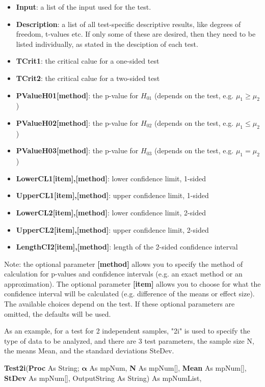 \begin{itemize}
	\item \textbf{Input}: a list of the input used for the test.
	\item \textbf{Description}: a list of all test-specific descriptive results, like degrees of freedom, t-values etc. If only some of these are desired, then they need to be listed individually, as stated in the desciption of each test.
	\item \textbf{TCrit1}: the critical calue for a one-sided test
	\item \textbf{TCrit2}: the critical calue for a two-sided test
	\item \textbf{PValueH01[method]}: the p-value for $H_{01}$ (depends on the test, e.g. $\mu_1 \geq \mu_2$)
	\item \textbf{PValueH02[method]}: the p-value for $H_{02}$ (depends on the test, e.g. $\mu_1 \leq \mu_2$)
	\item \textbf{PValueH03[method]}: the p-value for $H_{03}$ (depends on the test, e.g. $\mu_1 = \mu_2$)
	\item \textbf{LowerCL1[item],[method]}: lower confidence limit, 1-sided
	\item \textbf{UpperCL1[item],[method]}: upper confidence limit, 1-sided
	\item \textbf{LowerCL2[item],[method]}: lower confidence limit, 2-sided
	\item \textbf{UpperCL2[item],[method]}: upper confidence limit, 2-sided
	\item \textbf{LengthCI2[item],[method]}: length of the 2-sided confidence interval  
\end{itemize}
Note: the optional parameter \textbf{[method]} allows you to specify the method of calculation for p-values and confidence intervals (e.g. an exact method or an approximation). The optional parameter \textbf{[item]} allows you to choose for what the confidence interval will be calculated (e.g. difference of the means or effect size). The available choices depend on the test. If these optional parameters are omitted, the defaults will be used.

\vspace{0.3cm}
As an example, for a test for 2 independent samples, "2i" is used to specify the type of data to be analyzed, and there are 3 test parameters, the sample size \textsf{N}, the means  \textsf{Mean}, and the standard deviations \textsf{SteDev}.

\vspace{0.3cm}
\textsf{\textbf{Test2i}(\textbf{Proc} As String; $\boldsymbol{\alpha}$ As mpNum, \textbf{N} As mpNum[], \textbf{Mean} As mpNum[],  \textbf{StDev} As mpNum[], OutputString As String) As mpNumList}, 

